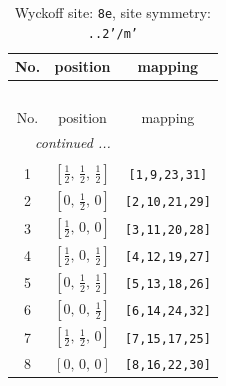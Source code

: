 \documentclass[fleqn,8pt]{jsarticle}
\begin{document}
\renewcommand{\arraystretch}{1.2}
\begin{longtable}{ccc}
\caption{Wyckoff site: {\tt 8e}, site symmetry: {\tt ..2'/m'}}
 \\
 \hline \hline
No. & position & mapping \\ \hline \endfirsthead

\multicolumn{2}{l}{\tablename\ \thetable{}} \\
 \hline \hline
No. & position & mapping \\ \hline \endhead

 \hline \hline
\multicolumn{2}{r}{\footnotesize\it continued ...} \\ \endfoot

 \hline \hline
\multicolumn{2}{r}{} \\ \endlastfoot

1 & $\left[ \frac{1}{2},\, \frac{1}{2},\, \frac{1}{2} \right]$ & {\tt [1,9,23,31]} \\ \hline
2 & $\left[ 0,\, \frac{1}{2},\, 0 \right]$ & {\tt [2,10,21,29]} \\ \hline
3 & $\left[ \frac{1}{2},\, 0,\, 0 \right]$ & {\tt [3,11,20,28]} \\ \hline
4 & $\left[ \frac{1}{2},\, 0,\, \frac{1}{2} \right]$ & {\tt [4,12,19,27]} \\ \hline
5 & $\left[ 0,\, \frac{1}{2},\, \frac{1}{2} \right]$ & {\tt [5,13,18,26]} \\ \hline
6 & $\left[ 0,\, 0,\, \frac{1}{2} \right]$ & {\tt [6,14,24,32]} \\ \hline
7 & $\left[ \frac{1}{2},\, \frac{1}{2},\, 0 \right]$ & {\tt [7,15,17,25]} \\ \hline
8 & $\left[ 0,\, 0,\, 0 \right]$ & {\tt [8,16,22,30]} \\
\end{longtable}
\renewcommand{\arraystretch}{1.2}
\end{document}
